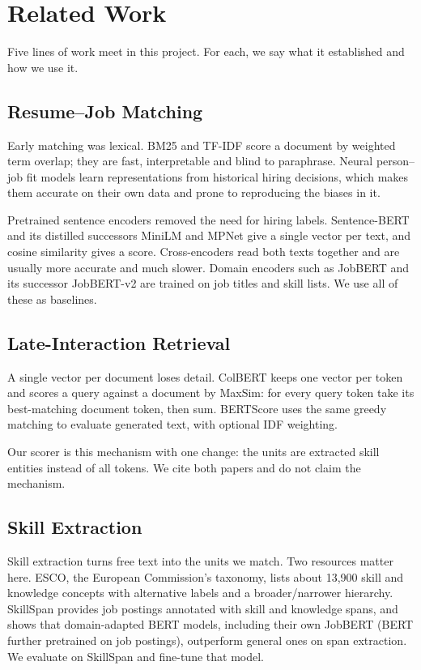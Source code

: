 \documentclass[conference,a4paper]{IEEEtran}
\begin{document}
\section{Related Work}
Five lines of work meet in this project. For each, we say what it established and how we use it.

\subsection{Resume–Job Matching}
Early matching was lexical. BM25 \cite{bm25} and TF-IDF score a document by weighted term overlap; they are fast, interpretable and blind to paraphrase. Neural person–job fit models \cite{pjfnn,apjfnn} learn representations from historical hiring decisions, which makes them accurate on their own data and prone to reproducing the biases in it.

Pretrained sentence encoders removed the need for hiring labels. Sentence-BERT \cite{sbert} and its distilled successors MiniLM \cite{minilm} and MPNet \cite{mpnet} give a single vector per text, and cosine similarity gives a score. Cross-encoders \cite{monobert} read both texts together and are usually more accurate and much slower. Domain encoders such as JobBERT \cite{jobbert} and its successor JobBERT-v2 are trained on job titles and skill lists. We use all of these as baselines.

\subsection{Late-Interaction Retrieval}
A single vector per document loses detail. ColBERT \cite{colbert} keeps one vector per token and scores a query against a document by MaxSim: for every query token take its best-matching document token, then sum. BERTScore \cite{bertscore} uses the same greedy matching to evaluate generated text, with optional IDF weighting.

Our scorer is this mechanism with one change: the units are extracted skill entities instead of all tokens. We cite both papers and do not claim the mechanism.

\subsection{Skill Extraction}
Skill extraction turns free text into the units we match. Two resources matter here. ESCO, the European Commission's taxonomy, lists about 13,900 skill and knowledge concepts with alternative labels and a broader/narrower hierarchy. SkillSpan \cite{skillspan} provides job postings annotated with skill and knowledge spans, and shows that domain-adapted BERT models, including their own JobBERT (BERT further pretrained on job postings), outperform general ones on span extraction. We evaluate on SkillSpan and fine-tune that model.
\end{document}

